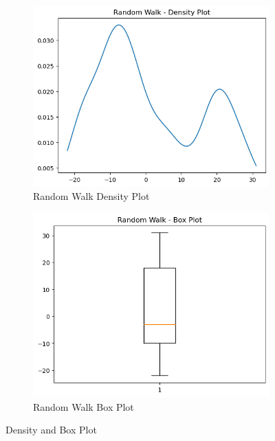 \documentclass{article}
\begin{document}
\begin{figure}[htbp]
  \centering
  \begin{subfigure}[b]{0.45\textwidth}
    \includegraphics[width=\textwidth]{img/random_walk/density_plot.png}
    \caption{Random Walk Density Plot}
    \label{fig:rndmwalkdensity}
  \end{subfigure}
  \hfill
  \begin{subfigure}[b]{0.45\textwidth}
    \includegraphics[width=\textwidth]{img/random_walk/box_plot.png}
    \caption{Random Walk Box Plot}
    \label{fig:rndmwalkbox}
  \end{subfigure}
  \caption{Density and Box Plot}
  \label{fig:rndmwalk2}
\end{figure}
\end{document}
